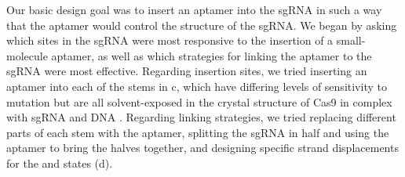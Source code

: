 \documentclass[10pt,oneside]{article}
\begin{document}

Our basic design goal was to insert an aptamer into the sgRNA in such a way that the aptamer would control the structure of the sgRNA.  We began by asking which sites in the sgRNA were most responsive to the insertion of a small-molecule aptamer, as well as which strategies for linking the aptamer to the sgRNA were most effective.  Regarding insertion sites, we tried inserting an aptamer into each of the stems in c, which have differing levels of sensitivity to mutation \autocite{briner2014} but are all solvent-exposed in the crystal structure of Cas9 in complex with sgRNA and DNA \autocite{nishimasu2014}.  Regarding linking strategies, we tried replacing different parts of each stem with the aptamer, splitting the sgRNA in half and using the aptamer to bring the halves together, and designing specific strand displacements for the \apo{} and \holo{} states (d).  
\end{document}
